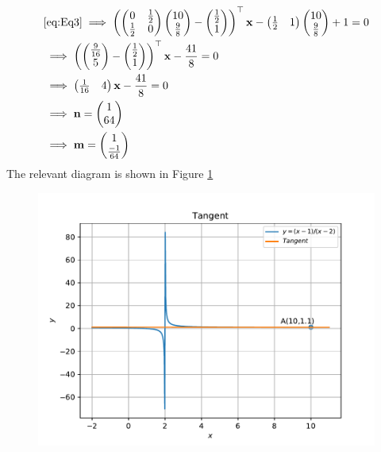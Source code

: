 \documentclass[12pt]{article}
\providecommand{\brak}[1]{\ensuremath{\left(#1\right)}}
\newcommand{\myvec}[1]{\ensuremath{\begin{pmatrix}#1\end{pmatrix}}}
\let\vec\mathbf
\begin{document}
\begin{enumerate}
\begin{align}
	& \eqref{eq:Eq3} \implies \brak{\myvec{ 0 & \frac{1}{2} \\ \frac{1}{2} & 0}\myvec{10\\\frac{9}{8}} - \myvec{\frac{1}{2} \\ 1}}^\top \vec{x} - \myvec{\frac{1}{2} & 1}\myvec{10 \\\frac{9}{8}} + 1 = 0  \\
	& \implies \brak{\myvec{ \frac{9}{16} \\ 5} - \myvec{\frac{1}{2} \\ 1}}^\top \vec{x} - \frac{41}{8} = 0 \\
	& \implies \myvec{\frac{1}{16} & 4}\vec{x} - \frac{41}{8} = 0 \\
	& \implies \vec{n} = \myvec{1 \\ 64}\\
	& \implies \vec{m} = \myvec{1 \\ \frac{-1}{64}}
\end{align}
The relevant diagram is shown in Figure \ref{fig:Fig1}
\begin{figure}[!h]
	\begin{center}
		\includegraphics[width=\columnwidth]{figs/problem2.pdf}
	\end{center}
\caption{}
\label{fig:Fig1}
\end{figure}
\end{enumerate}
\end{document}
